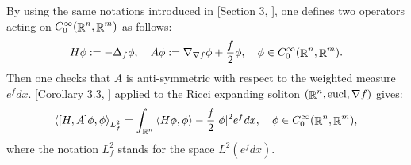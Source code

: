 \documentclass[a4paper,11pt,reqno]{amsart}
\def\eucl{\mathop{\rm eucl}\nolimits}
\def\eucl{\mathop{\rm eucl}\nolimits}
\def\R{\mathop{\rm \mathbb{R}}\nolimits}
\begin{document}
By using the same notations introduced in [Section $3$, \cite{Uni-Con-Egs-Der}], one defines two operators acting on $C^{\infty}_0(\R^n,\R^m)$ as follows:
\begin{eqnarray*}
H\phi:=-\Delta_f\phi,\quad A\phi:=\nabla_{\nabla f}\phi+\frac{f}{2}\phi,\quad \phi\in C^{\infty}_0(\R^n,\R^m).
\end{eqnarray*}
Then one checks that $A$ is anti-symmetric with respect to the weighted measure $e^fdx$. [Corollary $3.3$, \cite{Uni-Con-Egs-Der}] applied to the Ricci expanding soliton $(\R^n,\eucl,\nabla f)$ gives:
\begin{eqnarray}
\left<[H,A]\phi,\phi\right>_{L^2_f}=\int_{\R^n}\left<H\phi,\phi\right>-\frac{f}{2}|\phi|^2e^fdx,\quad\phi\in C^{\infty}_0(\R^n,\R^m),\label{Mourre-est}
\end{eqnarray}
where the notation $L^2_f$ stands for the space $L^2(e^fdx)$.
\end{document}
